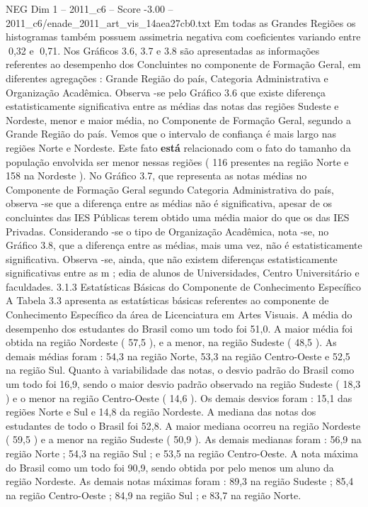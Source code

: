 \begin{textsample}{NEG Dim 1 – 2011\_c6 – Score -3.00 – 2011\_c6/enade\_2011\_art\_vis\_14aea27cb0.txt}
Em todas as Grandes Regiões os histogramas também possuem assimetria negativa com coeficientes variando entre 0,32 e 0,71.
Nos Gráficos 3.6, 3.7 e 3.8 são apresentadas as informações referentes ao desempenho dos Concluintes no componente de Formação Geral, em diferentes agregações : Grande Região do país, Categoria Administrativa e Organização Acadêmica.
Observa -se pelo Gráfico 3.6 que existe diferença estatisticamente significativa entre as médias das notas das regiões Sudeste e Nordeste, menor e maior média, no Componente de Formação Geral, segundo a Grande Região do país.
Vemos que o intervalo de confiança é mais largo nas regiões Norte e Nordeste.
Este fato \textbf{está} relacionado com o fato do tamanho da população envolvida ser menor nessas regiões ( 116 presentes na região Norte e 158 na Nordeste ).
No Gráfico 3.7, que representa as notas médias no Componente de Formação Geral segundo Categoria Administrativa do país, observa -se que a diferença entre as médias não é significativa, apesar de os concluintes das IES Públicas terem obtido uma média maior do que os das IES Privadas.
Considerando -se o tipo de Organização Acadêmica, nota -se, no Gráfico 3.8, que a diferença entre as médias, mais uma vez, não é estatisticamente significativa.
Observa -se, ainda, que não existem diferenças estatisticamente significativas entre as m ; edia de alunos de Universidades, Centro Universitário e faculdades. 3.1.3 Estatísticas Básicas do Componente de Conhecimento Específico A Tabela 3.3 apresenta as estatísticas básicas referentes ao componente de Conhecimento Específico da área de Licenciatura em Artes Visuais.
A média do desempenho dos estudantes do Brasil como um todo foi 51,0.
A maior média foi obtida na região Nordeste ( 57,5 ), e a menor, na região Sudeste ( 48,5 ).
As demais médias foram : 54,3 na região Norte, 53,3 na região Centro-Oeste e 52,5 na região Sul.
Quanto à variabilidade das notas, o desvio padrão do Brasil como um todo foi 16,9, sendo o maior desvio padrão observado na região Sudeste ( 18,3 ) e o menor na região Centro-Oeste ( 14,6 ).
Os demais desvios foram : 15,1 das regiões Norte e Sul e 14,8 da região Nordeste.
A mediana das notas dos estudantes de todo o Brasil foi 52,8.
A maior mediana ocorreu na região Nordeste ( 59,5 ) e a menor na região Sudeste ( 50,9 ).
As demais medianas foram : 56,9 na região Norte ; 54,3 na região Sul ; e 53,5 na região Centro-Oeste.
A nota máxima do Brasil como um todo foi 90,9, sendo obtida por pelo menos um aluno da região Nordeste.
As demais notas máximas foram : 89,3 na região Sudeste ; 85,4 na região Centro-Oeste ; 84,9 na região Sul ; e 83,7 na região Norte.

\end{textsample}
